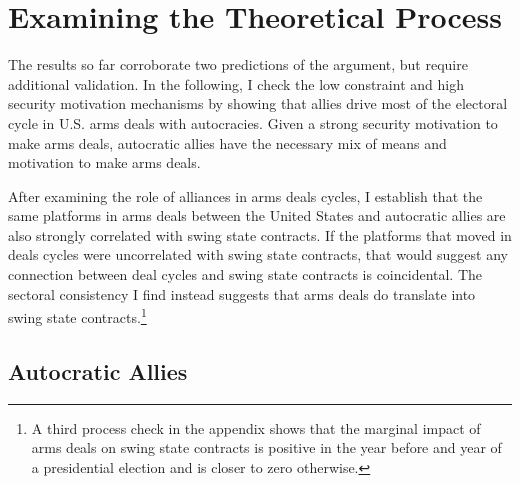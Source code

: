\documentclass[12pt]{article}
\begin{document}
%
%


\section{Examining the Theoretical Process}


The results so far corroborate two predictions of the argument, but require additional validation. 
In the following, I check the low constraint and high security motivation mechanisms by showing that allies drive most of the electoral cycle in U.S. arms deals with autocracies.  
Given a strong security motivation to make arms deals, autocratic allies have the necessary mix of means and motivation to make arms deals.


After examining the role of alliances in arms deals cycles, I establish that the same platforms in arms deals between the United States and autocratic allies are also strongly correlated with swing state contracts.
If the platforms that moved in deals cycles were uncorrelated with swing state contracts, that would suggest any connection between deal cycles and swing state contracts is coincidental.
The sectoral consistency I find instead suggests that arms deals do translate into swing state contracts.\footnote{A third process check in the appendix shows that the marginal impact of arms deals on swing state contracts is positive in the year before and year of a presidential election and is closer to zero otherwise.}



\subsection{Autocratic Allies}
\end{document}
